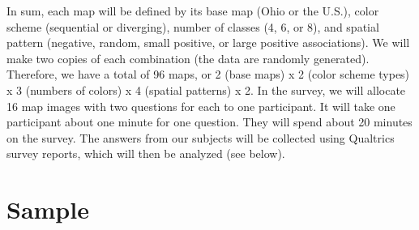 

In sum, each map will be defined by its base map (Ohio or the U.S.), color scheme (sequential or diverging), number of classes (4, 6, or 8), and spatial pattern (negative, random, small positive, or large positive associations). We will make two copies of each combination (the data are randomly generated). Therefore, we have a total of 96 maps, or 2 (base maps) x 2 (color scheme types) x 3 (numbers of colors) x 4 (spatial patterns) x 2. In the survey, we will allocate 16 map images with two questions for each to one participant. It will take one participant about one minute for one question. They will spend about 20 minutes on the survey. The answers from our subjects will be collected using Qualtrics survey reports, which will then be analyzed (see below).


\section{Sample}

